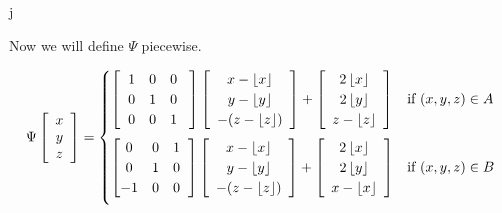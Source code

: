 j\documentclass[]{article}
\begin{document}
Now we will define $\Psi$ piecewise.

\begin{equation}
\Psi\left[\begin{array}{c}
	x\\y\\z
\end{array}\right] 
= 
\begin{cases}
	\left[ \hspace{2mm} \begin{matrix}
		1 & 0 & 0 \\
		0 & 1 & 0 \\
		0 & 0 & 1
	\end{matrix}\hspace{3mm}\right]

	\left[\begin{array}{c}
	x - \left\lfloor x \right\rfloor
	\\ y- \left\lfloor y \right\rfloor
	\\ -(z - \left\lfloor z \right\rfloor)
	\end{array} \right]
	+
	\left[\begin{array}{c}
		2 \left\lfloor x \right\rfloor
		\\ 2\left\lfloor y \right\rfloor
		\\ z - \left\lfloor z \right\rfloor
	\end{array} \right]
		& \text{if } (x,y,z)\in A	\vspace{2mm}
	\\
		
		
	\left[ \begin{matrix}
	0 & 0 & 1 \\
	0 & 1 & 0 \\
	-1 & 0 & 0
	\end{matrix}\hspace{2mm}\right]
	\left[\begin{array}{c}
		x - \left\lfloor x \right\rfloor
		\\ y- \left\lfloor y \right\rfloor
		\\ -(z - \left\lfloor z \right\rfloor)
		\end{array} \right]
	+
		\left[\begin{array}{c}
			2 \left\lfloor x \right\rfloor
			\\ 2\left\lfloor y \right\rfloor
			\\ x - \left\lfloor x \right\rfloor
		\end{array} \right]
			& \text{if } (x,y,z)\in B	\vspace{2mm}
	\\
	

\end{cases}
\end{equation}
\end{document}

